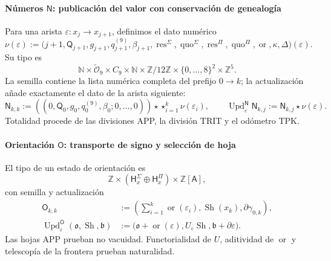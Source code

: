 \paragraph{Números \(\mathsf N\): publicación del valor con conservación de genealogía}
Para una arista \(\varepsilon:x_j\to x_{j+1}\), definimos el dato numérico
\begin{equation}
\label{eq:pdfv2-terminal-numero-arista}
 \nu(\varepsilon):=
 \bigl(j+1,\mathsf Q_{j+1},g_{j+1},q^{(9)}_{j+1},\beta_{j+1},
 \operatorname{res}^{\Sigma},\operatorname{quo}^{\Sigma},
 \operatorname{res}^{\Pi},\operatorname{quo}^{\Pi},
 \operatorname{or},\kappa,\Delta\bigr)(\varepsilon).
\end{equation}
Su tipo es
\[
 \mathbb N\times\widetilde{\mathcal O}_9\times C_9\times\mathbb N
 \times\mathbb Z/12\mathbb Z
 \times\{0,\ldots,8\}^2\times\mathbb Z^5.
\]
La semilla contiene la lista numérica completa del prefijo \(0\to k\);
la actualización añade exactamente el dato de la arista siguiente:
\begin{equation}
\label{eq:pdfv2-terminal-update-n}
 \mathsf N_{k,k}:=
 ((0,\mathsf Q_0,g_0,q^{(9)}_0,\beta_0;0,\ldots,0))
 \star\mathop{\star}_{i=1}^{k}\nu(\varepsilon_i),\qquad
 \operatorname{Upd}^{\mathsf N}_{\varepsilon}\mathsf N_{k,j}
 :=\mathsf N_{k,j}\star\nu(\varepsilon).
\end{equation}
Totalidad procede de las divisiones APP, la división TRIT y el odómetro TPK.

\paragraph{Orientación \(\mathsf O\): transporte de signo y selección de hoja}
El tipo de un estado de orientación es
\[
 \mathbb Z\times
 (\mathsf H^\Sigma_x\oplus\mathsf H^\Pi_x)
 \times\mathbb Z[\mathsf A],
\]
con semilla y actualización
\begin{align}
 \mathsf O_{k,k}&:=
 \left(\sum_{i=1}^{k}\operatorname{or}(\varepsilon_i),
       \operatorname{Sh}(x_k),\partial\gamma_{0,k}\right),
 \label{eq:pdfv2-terminal-semilla-o}\\
 \operatorname{Upd}^{\mathsf O}_{\varepsilon}
 (\mathfrak o,\operatorname{Sh},\mathfrak b)
 &:=
 \bigl(\mathfrak o+\operatorname{or}(\varepsilon),
 U_\varepsilon\operatorname{Sh},
 \mathfrak b+\partial\varepsilon\bigr).
 \label{eq:pdfv2-terminal-update-o}
\end{align}
Las hojas APP prueban no vacuidad. Functorialidad de \(U\), aditividad de
\(\operatorname{or}\) y telescopía de la frontera prueban naturalidad.

